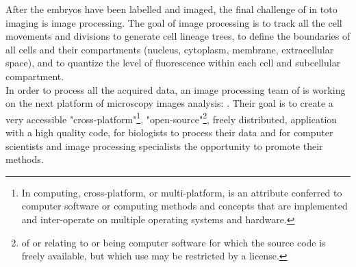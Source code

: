After the embryos have been labelled and imaged, the final challenge of in toto
imaging is image processing. The goal of image processing is to track all the
cell movements and divisions to generate cell lineage trees, to define the
boundaries of all cells and their compartments (nucleus, cytoplasm, membrane,
extracellular space), and to quantize the level of fluorescence within each
cell and subcellular compartment.\\

In order to process all the acquired data, an image processing team of
is working on the next platform of microscopy images analysis: {\gofigure}.
Their goal is to create a very accessible "cross-platform"\footnote{In
computing, cross-platform, or multi-platform, is
an attribute conferred to computer software or computing methods and concepts
that are implemented and inter-operate on multiple operating systems and
hardware.}, "open-source"\footnote{of or
relating to or being computer software for which
the source code is freely available, but which use may be restricted by a
license.}, freely distributed, application with a high quality code, for
biologists to process their data and for computer scientists and image
processing specialists the opportunity to promote their methods.




%
%
%


